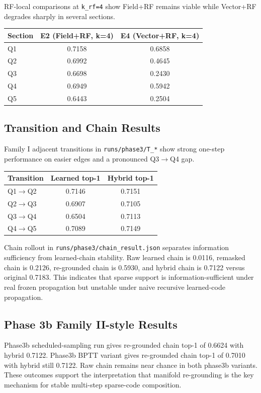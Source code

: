 \documentclass[11pt]{article}
\begin{document}
RF-local comparisons at \texttt{k\_rf=4} show Field+RF remains viable while Vector+RF degrades sharply in several sections.

\begin{center}
\begin{tabular}{lcc}
\toprule
Section & E2 (Field+RF, k=4) & E4 (Vector+RF, k=4) \\
\midrule
Q1 & 0.7158 & 0.6858 \\
Q2 & 0.6992 & 0.4645 \\
Q3 & 0.6698 & 0.2430 \\
Q4 & 0.6949 & 0.5942 \\
Q5 & 0.6443 & 0.2504 \\
\bottomrule
\end{tabular}
\end{center}

\subsection{Transition and Chain Results}
Family I adjacent transitions in \texttt{runs/phase3/T\_*} show strong one-step performance on easier edges and a pronounced Q3$\rightarrow$Q4 gap.

\begin{center}
\begin{tabular}{lcc}
\toprule
Transition & Learned top-1 & Hybrid top-1 \\
\midrule
Q1$\rightarrow$Q2 & 0.7146 & 0.7151 \\
Q2$\rightarrow$Q3 & 0.6907 & 0.7105 \\
Q3$\rightarrow$Q4 & 0.6504 & 0.7113 \\
Q4$\rightarrow$Q5 & 0.7089 & 0.7149 \\
\bottomrule
\end{tabular}
\end{center}

Chain rollout in \texttt{runs/phase3/chain\_result.json} separates information sufficiency from learned-chain stability. Raw learned chain is 0.0116, remasked chain is 0.2126, re-grounded chain is 0.5930, and hybrid chain is 0.7122 versus original 0.7183. This indicates that sparse support is information-sufficient under real frozen propagation but unstable under naive recursive learned-code propagation.

\subsection{Phase 3b Family II-style Results}
Phase3b scheduled-sampling run gives re-grounded chain top-1 of 0.6624 with hybrid 0.7122. Phase3b BPTT variant gives re-grounded chain top-1 of 0.7010 with hybrid still 0.7122. Raw chain remains near chance in both phase3b variants. These outcomes support the interpretation that manifold re-grounding is the key mechanism for stable multi-step sparse-code composition.
\end{document}
